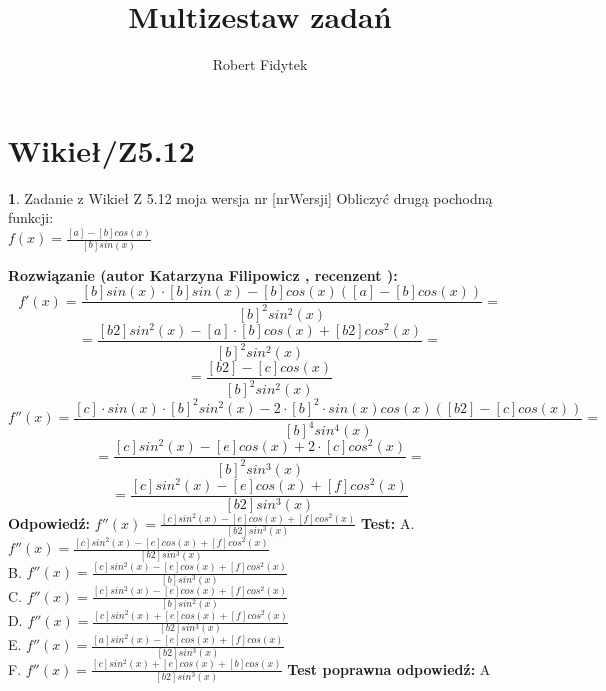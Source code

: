 \documentclass[12pt, a4paper]{article}
\title{Multizestaw zadań}
\author{Robert Fidytek}
\date{}
\theoremstyle{definition} %
\newtheorem{zad}{}
\newcommand{\kategoria}[1]{\section{#1}} %
\newcommand{\zadStart}[1]{\begin{zad}#1\newline} %
\newcommand{\zadStop}{\end{zad}}   %
\newcommand{\rozwStart}[2]{\noindent \textbf{Rozwiązanie (autor #1 , recenzent #2): }\newline} %
\newcommand{\rozwStop}{\newline}                                            %
\newcommand{\odpStart}{\noindent \textbf{Odpowiedź:}\newline}    %
\newcommand{\odpStop}{\newline}                                             %
\newcommand{\testStart}{\noindent \textbf{Test:}\newline} %
\newcommand{\testStop}{\newline} %
\newcommand{\kluczStart}{\noindent \textbf{Test poprawna odpowiedź:}\newline} %
\newcommand{\kluczStop}{\newline} %
\begin{document}
\maketitle


\kategoria{Wikieł/Z5.12}
\zadStart{Zadanie z Wikieł Z 5.12 moja wersja nr [nrWersji]}
Obliczyć drugą pochodną funkcji:\\
$f(x)=\frac{[a]-[b]cos(x)}{[b]sin(x)}$
\zadStop
\rozwStart{Katarzyna Filipowicz}{}
$$
f'(x)=\frac{[b]sin(x)\cdot[b] sin(x)-[b]cos(x)([a]-[b]cos(x))}{[b]^2sin^2(x)}=
$$ $$
=\frac{[b2]sin^2(x)-[a]\cdot [b] cos(x)+[b2]cos^2(x)}{[b]^2sin^2(x)}=
$$ $$
=\frac{[b2]-[c]cos(x)}{[b]^2sin^2(x)}
$$ $$
f''(x)=\frac{[c]\cdot sin(x)\cdot[b]^2 sin^2(x)-2\cdot[b]^2\cdot sin(x)cos(x)([b2]-[c]cos(x))}{[b]^4sin^4(x)}=
$$ $$
=\frac{[c]sin^2(x)-[e]cos(x)+2\cdot [c]cos^2(x)}{[b]^2sin^3(x)}=
$$ $$
=\frac{[c]sin^2(x)-[e]cos(x)+[f]cos^2(x)}{[b2]sin^3(x)}
$$
\rozwStop
\odpStart
$f''(x)=\frac{[c]sin^2(x)-[e]cos(x)+[f]cos^2(x)}{[b2]sin^3(x)}$
\odpStop
\testStart
A. $f''(x)=\frac{[c]sin^2(x)-[e]cos(x)+[f]cos^2(x)}{[b2]sin^3(x)}$\\
B. $f''(x)=\frac{[c]sin^2(x)-[e]cos(x)+[f]cos^2(x)}{[b]sin^3(x)}$\\
C. $f''(x)=\frac{[c]sin^2(x)-[e]cos(x)+[f]cos^2(x)}{[b]sin^2(x)}$\\
D. $f''(x)=\frac{[c]sin^2(x)+[e]cos(x)+[f]cos^2(x)}{[b2]sin^3(x)}$\\
E. $f''(x)=\frac{[a]sin^2(x)-[e]cos(x)+[f]cos(x)}{[b2]sin^3(x)}$\\
F. $f''(x)=\frac{[c]sin^2(x)+[e]cos(x)+[b]cos(x)}{[b2]sin^3(x)}$
\testStop
\kluczStart
A
\kluczStop
\end{document}
